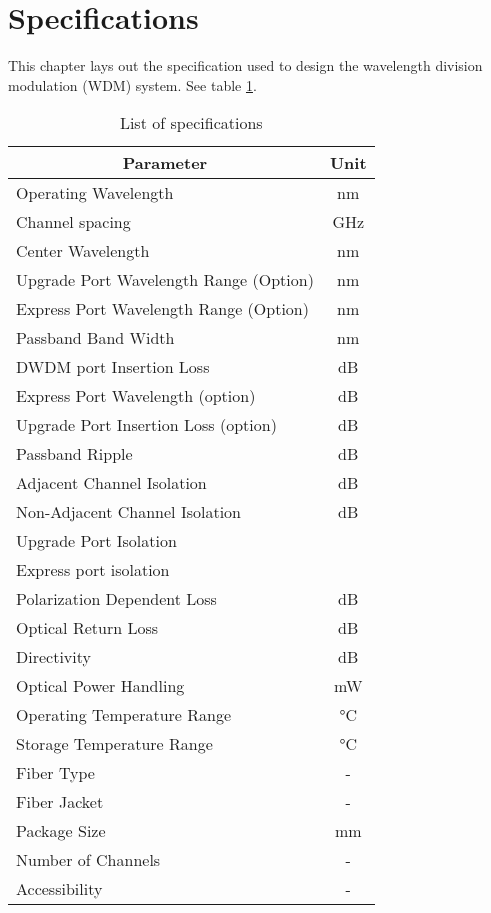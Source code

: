 \section{Specifications}
\label{sec:specifications}
This chapter lays out the specification used to design the wavelength division modulation (WDM) system. See table \ref{table:specs}.

\begin{table}[h!]
	\centering
	\cite{noauthor_gofoton_nodate}
	\begin{tabular} {|l|c|}
		\hline
		\multicolumn{1}{|c|}{\textbf{Parameter}} & \textbf{Unit} \\ \hline\hline
		Operating Wavelength & \unit{\nm} \\ \hline
		Channel spacing & \unit{\GHz} \\ \hline
		Center Wavelength & \unit{\nm} \\ \hline
		Upgrade Port Wavelength Range (Option) & \unit{\nm} \\ \hline
		Express Port Wavelength Range (Option) & \unit{\nm} \\ \hline
		Passband Band Width & \unit{\nm} \\ \hline
		DWDM port Insertion Loss & \unit{\dB} \\ \hline
		Express Port Wavelength (option) & \unit{\dB} \\ \hline
		Upgrade Port Insertion Loss (option) & \unit{\dB} \\ \hline
		Passband Ripple & \unit{\dB} \\ \hline
		Adjacent Channel Isolation & \unit{\dB} \\ \hline
		Non-Adjacent Channel Isolation & \unit{\dB} \\ \hline
		Upgrade Port Isolation & \\ \hline
		Express port isolation & \\ \hline
		Polarization Dependent Loss & \unit{\dB} \\ \hline
		Optical Return Loss & \unit{\dB} \\ \hline
		Directivity & \unit{\dB} \\ \hline
		Optical Power Handling & \unit{\mW} \\ \hline
		Operating Temperature Range & \unit{\degreeCelsius} \\ \hline
		Storage Temperature Range & \unit{\degreeCelsius} \\ \hline
		Fiber Type & - \\ \hline
		Fiber Jacket & - \\ \hline
		Package Size & \unit{\mm} \\ \hline
		Number of Channels & - \\ \hline
		Accessibility & - \\ \hline
	\end{tabular}
	\caption{List of specifications}
	\label{table:specs}
\end{table}

